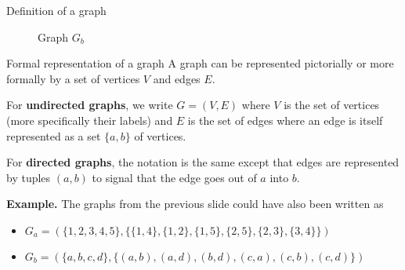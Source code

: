 \documentclass[10pt]{beamer}
\begin{document}
\begin{frame}{Definition of a graph}
\begin{figure}
\begin{minipage}{0.3\textwidth}
            \caption*{Graph $G_b$}
        \end{minipage}
    \end{figure}
\end{frame}

\begin{frame}{Formal representation of a graph}
    A graph can be represented pictorially or more formally by a set of vertices $V$ and edges $E$.

    For \textbf{undirected graphs}, we write $G = (V, E)$ where $V$ is the set of vertices (more specifically their labels) and $E$ is the set of edges where an edge is itself represented as a set $\{a, b\}$ of vertices.

    For \textbf{directed graphs}, the notation is the same except that edges are represented by tuples $(a, b)$ to signal that the edge goes out of $a$ into $b$.

    \textbf{Example.} The graphs from the previous slide could have also been written as
    \begin{itemize}
        \item $G_a = (\{1, 2, 3, 4, 5\}, \{\{1, 4\}, \{1, 2\}, \{1, 5\}, \{2, 5\}, \{2, 3\}, \{3, 4\}\})$
        \item $G_b = (\{a, b, c, d\}, \{(a, b), (a, d), (b, d), (c, a), (c, b), (c, d)\})$
    \end{itemize}
\end{frame}
\end{document}
